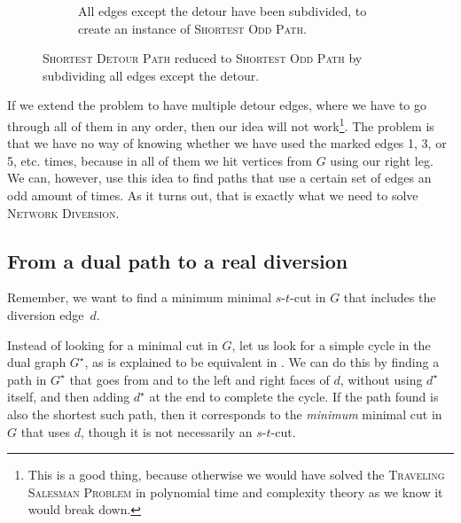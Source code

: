 \begin{figure}[H]
\begin{subfigure}{.45\textwidth}
{
        }
        \caption{All edges except the detour have been subdivided, to create an instance of \textsc{Shortest Odd Path}.}
        \label{figure:subdivided-detour}
    \end{subfigure}%
    \caption{\textsc{Shortest Detour Path} reduced to \textsc{Shortest Odd Path} by subdividing all edges except the detour.}
    \label{figure:subdividing-detours}
\end{figure}

If we extend the problem to have multiple detour edges, where we have to go through all of them in any order, then our idea will not work\footnote{This is a good thing, because otherwise we would have solved the \textsc{Traveling Salesman Problem} in polynomial time and complexity theory as we know it would break down.}.
The problem is that we have no way of knowing whether we have used the marked edges 1, 3, or 5, etc. times, because in all of them we hit vertices from $G$ using our right leg. We can, however, use this idea to find paths that use a certain set of edges an odd amount of times. As it turns out, that is exactly what we need to solve \textsc{Network Diversion}.

\subsection{From a dual path to a real diversion}
Remember, we want to find a minimum minimal $s$-$t$-cut in $G$ that includes the diversion edge~$d$.

Instead of looking for a minimal cut in $G$, let us look for a simple cycle in the dual graph $G^\star$, as is explained to be equivalent in . We can do this by finding a path in $G^\star$ that goes from and to the left and right faces of $d$, without using $d^\star$ itself, and then adding $d^\star$ at the end to complete the cycle. If the path found is also the shortest such path, then it corresponds to the \emph{minimum} minimal cut in $G$ that uses $d$, though it is not necessarily an $s$-$t$-cut.

